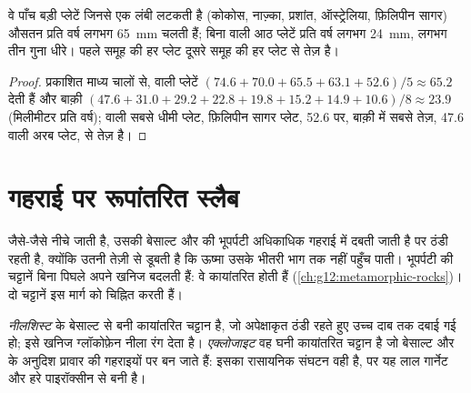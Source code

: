 \begin{proposition}[स्लैबों से जुड़ी प्लेटें तेज़ होती हैं]\label{prop:g11:subduction-zones:fast}
वे पाँच बड़ी प्लेटें जिनसे एक लंबी  लटकती है (कोकोस, नाज़्का, प्रशांत,
ऑस्ट्रेलिया, फ़िलिपीन सागर) औसतन प्रति वर्ष लगभग \qty{65}{mm} चलती हैं;
बिना  वाली आठ प्लेटें प्रति वर्ष लगभग \qty{24}{mm}, लगभग तीन गुना धीरे।
पहले समूह की हर प्लेट दूसरे समूह की हर प्लेट से तेज़ है।
\end{proposition}

\begin{proof}
प्रकाशित माध्य चालों से,  वाली प्लेटें
$(74.6 + 70.0 + 65.5 + 63.1 + 52.6)/5 \approx 65.2$ देती हैं और बाक़ी
$(47.6 + 31.0 + 29.2 + 22.8 + 19.8 + 15.2 + 14.9 + 10.6)/8 \approx 23.9$
(मिलीमीटर प्रति वर्ष);  वाली सबसे धीमी प्लेट, फ़िलिपीन सागर प्लेट,
52.6 पर, बाक़ी में सबसे तेज़, 47.6 वाली अरब प्लेट, से तेज़ है।
\end{proof}

\section{गहराई पर रूपांतरित स्लैब}

जैसे-जैसे  नीचे जाती है, उसकी बेसाल्ट और  की भूपर्पटी अधिकाधिक गहराई में
दबती जाती है पर ठंडी रहती है, क्योंकि  उतनी तेज़ी से डूबती है कि ऊष्मा उसके
भीतरी भाग तक नहीं पहुँच पाती। भूपर्पटी की चट्टानें बिना पिघले अपने खनिज बदलती हैं: वे
कायांतरित होती हैं (\cref{ch:g12:metamorphic-rocks})। दो चट्टानें इस मार्ग को चिह्नित करती हैं।

\begin{definition}[नीलशिस्ट; एक्लोजाइट]\label{def:g11:subduction-zones:eclogite}
\emph{नीलशिस्ट}  के बेसाल्ट से बनी
कायांतरित चट्टान है, जो अपेक्षाकृत ठंडी रहते हुए उच्च दाब तक दबाई गई हो;
इसे खनिज ग्लॉकोफ़ेन नीला रंग देता है। \emph{एक्लोजाइट}
वह घनी कायांतरित चट्टान है जो बेसाल्ट और   के अनुदिश
प्रावार की गहराइयों पर बन जाते हैं: इसका रासायनिक संघटन वही है, पर यह
लाल गार्नेट और हरे पाइरॉक्सीन से बनी है।
\end{definition}

